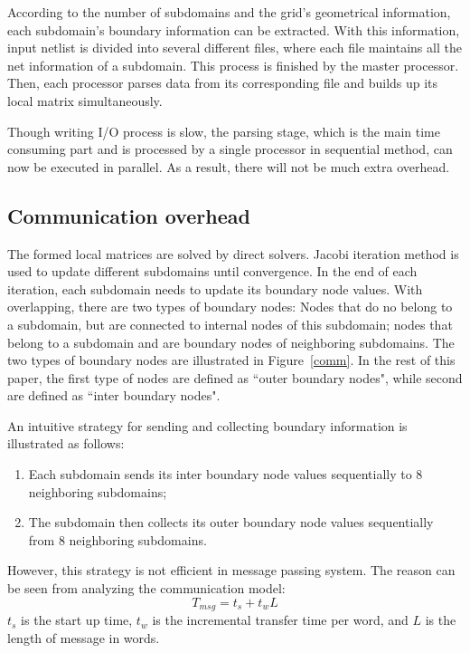 \documentclass{sig-alternate}
\begin{document}
	According to the number of subdomains and the grid's geometrical information, each subdomain's boundary information can be 
	extracted. With this information, input netlist is divided into several different files, where each file maintains all the net 
	information of a subdomain. This process is finished by the master processor. Then, each processor parses data from its
	corresponding file and builds up its local matrix simultaneously.

	Though writing I/O process is slow, the parsing stage, which is the main time consuming part and is 
	processed by a single processor in sequential method, can now be executed in parallel. As a result, 
	there will not be much extra overhead.
     \subsection{Communication overhead}
	The formed local matrices are solved by direct solvers. Jacobi iteration method is used
	to update different subdomains until convergence. In the end of each iteration, each subdomain needs to update its 
	boundary node values. With overlapping, there are two types of boundary nodes: Nodes that do no 
	belong to a subdomain, but are connected to internal nodes of 
	this subdomain; nodes that belong to a subdomain and are boundary nodes of neighboring subdomains. The 
	two types of boundary nodes are illustrated in Figure~\ref{comm}. In the rest of this paper, the first type of nodes are defined
	as ``outer boundary nodes", while second are defined as ``inter boundary nodes". 

	An intuitive strategy for sending and collecting boundary information is illustrated as follows:

	\begin{enumerate}[1.]
	  \item Each subdomain sends its inter boundary node values sequentially to 8 neighboring subdomains;
	  \item The subdomain then collects its outer boundary node values sequentially from 8 neighboring subdomains.
	\end{enumerate}	

 	However, this strategy is not efficient in message passing system. The reason can be seen from analyzing the
	communication model:
	\begin{equation}
		T_{msg} = t_s + t_wL\label{eq_msg}
	\end{equation}
	$t_s$ is the start up time, $t_w$ is the incremental transfer time per word, and $L$ is the length of message in words.
	
\end{document}
